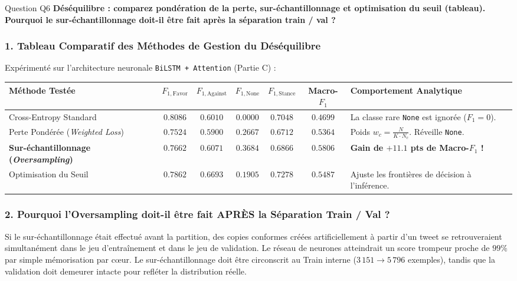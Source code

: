 \documentclass[11pt,a4paper]{article}
\begin{document}
\vspace{0.3cm}

\begin{questionbox}{Question Q6}
\textbf{Déséquilibre : comparez pondération de la perte, sur-échantillonnage et optimisation du seuil (tableau). Pourquoi le sur-échantillonnage doit-il être fait après la séparation train / val ?}
\end{questionbox}

\subsubsection*{1. Tableau Comparatif des Méthodes de Gestion du Déséquilibre}
Expérimenté sur l'architecture neuronale \texttt{BiLSTM + Attention} (Partie C) :

\begin{table}[htbp]
\centering
\small
\begin{tabularx}{\textwidth}{lcccccX}
\toprule
\textbf{Méthode Testée} & \textbf{$F_{1,\text{Favor}}$} & \textbf{$F_{1,\text{Against}}$} & \textbf{$F_{1,\text{None}}$} & \textbf{$F_{1,\text{Stance}}$} & \textbf{Macro-$F_1$} & \textbf{Comportement Analytique} \\
\midrule
Cross-Entropy Standard & $0.8086$ & $0.6010$ & $\mathbf{0.0000}$ & $\mathbf{0.7048}$ & $0.4699$ & La classe rare \texttt{None} est ignorée ($F_1=0$). \\
Perte Pondérée (\textit{Weighted Loss}) & $0.7524$ & $0.5900$ & $0.2667$ & $0.6712$ & $0.5364$ & Poids $w_c = \frac{N}{K \cdot N_c}$. Réveille \texttt{None}. \\
\textbf{Sur-échantillonnage (\textit{Oversampling})} & $0.7662$ & $0.6071$ & $\mathbf{0.3684}$ & $0.6866$ & $\mathbf{0.5806}$ & \textbf{Gain de $+11.1$ pts de Macro-$F_1$ !} \\
Optimisation du Seuil & $0.7862$ & $0.6693$ & $0.1905$ & $\mathbf{0.7278}$ & $0.5487$ & Ajuste les frontières de décision à l'inférence. \\
\bottomrule
\end{tabularx}
\end{table}

\subsubsection*{2. Pourquoi l'Oversampling doit-il être fait APRÈS la Séparation Train / Val ?}
Si le sur-échantillonnage était effectué avant la partition, des copies conformes créées artificiellement à partir d'un tweet se retrouveraient simultanément dans le jeu d'entraînement et dans le jeu de validation. Le réseau de neurones atteindrait un score trompeur proche de $99\%$ par simple mémorisation par cœur. Le sur-échantillonnage doit être circonscrit au Train interne ($3\,151 \to 5\,796$ exemples), tandis que la validation doit demeurer intacte pour refléter la distribution réelle.
\end{document}
